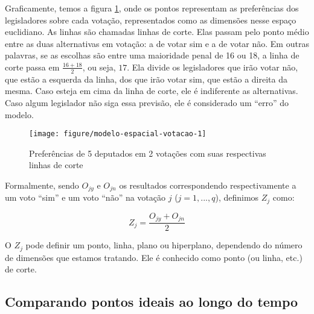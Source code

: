 \documentclass[a4paper,titlepage]{ppgi}\usepackage[]{graphicx}\usepackage[]{color}
\makeatletter
\def\maxwidth{ %
  \ifdim\Gin@nat@width>\linewidth
    \linewidth
  \else
    \Gin@nat@width
  \fi
}
\newenvironment{knitrout}{}{} %
\makeatother
\begin{document}
Graficamente, temos a figura \ref{fig:modelo-espacial-votacao}, onde os pontos
representam as preferências dos legisladores sobre cada votação, representados
como as dimensões nesse espaço euclidiano. As linhas são chamadas linhas de
corte. Elas passam pelo ponto médio entre as duas alternativas em votação: a de
votar sim e a de votar não. Em outras palavras, se as escolhas são entre uma
maioridade penal de 16 ou
18, a linha de corte passa em $\frac{16 + 18}{2}$,
ou seja, $17$. Ela divide os legisladores que irão votar não, que estão a
esquerda da linha, dos que irão votar sim, que estão a direita da mesma. Caso
esteja em cima da linha de corte, ele é indiferente as alternativas. Caso algum
legislador não siga essa previsão, ele é considerado um ``erro'' do modelo.

\begin{knitrout}
\color{fgcolor}\begin{figure}
\texttt{[image: figure/modelo-espacial-votacao-1]} \caption[Preferências de 5 deputados em 2 votações com suas respectivas linhas de corte]{Preferências de 5 deputados em 2 votações com suas respectivas linhas de corte}\label{fig:modelo-espacial-votacao}
\end{figure}


\end{knitrout}

Formalmente, sendo $O_{jy}$ e $O_{jn}$ os resultados correspondendo
respectivamente a um voto ``sim'' e um voto ``não'' na votação $j$ ($j = 1,
..., q$), definimos $Z_j$ como: 

\begin{equation}\label{eq:cutpoint}
  Z_j = \frac{O_{jy} + O_{jn}}{2}
\end{equation}

O $Z_j$ pode definir um ponto, linha, plano ou hiperplano, dependendo do número
de dimensões que estamos tratando. Ele é conhecido como ponto (ou linha, etc.)
de corte.







\subsection{Comparando pontos ideais ao longo do tempo}
\label{cap:fundamentacao:comparando-pontos-ideais-no-tempo}
\end{document}
